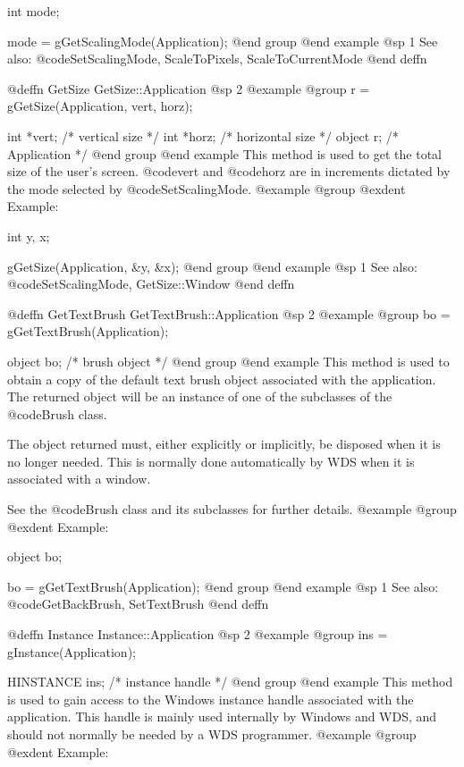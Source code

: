int     mode;

mode = gGetScalingMode(Application);
@end group
@end example
@sp 1
See also:  @code{SetScalingMode, ScaleToPixels, ScaleToCurrentMode}
@end deffn



@deffn {GetSize} GetSize::Application
@sp 2
@example
@group
r = gGetSize(Application, vert, horz);

int    *vert;   /*  vertical size    */
int    *horz;   /*  horizontal size  */
object  r;      /*  Application      */
@end group
@end example
This method is used to get the total size of the user's screen.
@code{vert} and @code{horz} are in increments dictated by the
mode selected by @code{SetScalingMode}.  
@example
@group
@exdent Example:

int     y, x;

gGetSize(Application, &y, &x);
@end group
@end example
@sp 1
See also:  @code{SetScalingMode, GetSize::Window}
@end deffn



@deffn {GetTextBrush} GetTextBrush::Application
@sp 2
@example
@group
bo = gGetTextBrush(Application);

object  bo;     /*  brush object  */
@end group
@end example
This method is used to obtain a copy of the default text brush object
associated with the application.  The returned object will be an
instance of one of the subclasses of the @code{Brush} class.

The object returned must, either explicitly or implicitly, be
disposed when it is no longer needed.  This is normally done
automatically by WDS when it is associated with a window.

See the @code{Brush} class and its subclasses for further details.
@example
@group
@exdent Example:

object  bo;

bo = gGetTextBrush(Application);
@end group
@end example
@sp 1
See also:  @code{GetBackBrush, SetTextBrush}
@end deffn



@deffn {Instance} Instance::Application
@sp 2
@example
@group
ins = gInstance(Application);

HINSTANCE  ins;    /*  instance handle   */
@end group
@end example
This method is used to gain access to the Windows instance handle
associated with the application.  This handle is mainly used internally
by Windows and WDS, and should not normally be needed by a WDS
programmer.
@example
@group
@exdent Example:

